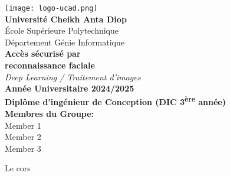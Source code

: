 \documentclass[12pt,a4paper]{article}
\begin{document}
\begin{titlepage}
\begin{center}
    \texttt{[image: logo-ucad.png]}\\[1cm]
    
    {\LARGE\textbf{Université Cheikh Anta Diop}}\\[0.5cm]
    {\Large École Supérieure Polytechnique}\\[0.3cm]
    {\large Département Génie Informatique}\\[2cm]
    
    {\Huge\textbf{Accès sécurisé par\\reconnaissance faciale}}\\[2cm]
    
    {\Large\textit{Deep Learning / Traitement d'images}}\\[2cm]
    
    \textbf{Année Universitaire 2024/2025}\\
    \textbf{Diplôme d'ingénieur de Conception (DIC 3\textsuperscript{ère} année)}\\[2cm]
    
    \textbf{Membres du Groupe:}\\[0.5cm]
    Member 1\\
    Member 2\\
    Member 3\\[2cm]
\end{center}
\end{titlepage}

\tableofcontents
\newpage

Le cors
\end{document}
